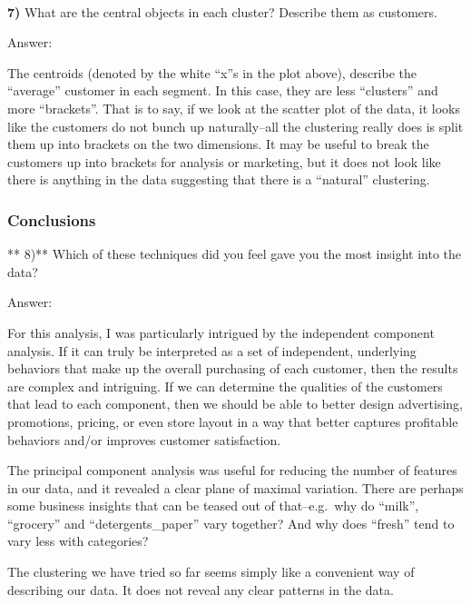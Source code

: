 \documentclass{article}
\begin{document}
    \begin{center}
    \end{center}
    { \hspace*{\fill} \\}
    
    \textbf{7)} What are the central objects in each cluster? Describe them
as customers.

    Answer:

The centroids (denoted by the white ``x''s in the plot above), describe
the ``average'' customer in each segment. In this case, they are less
``clusters'' and more ``brackets''. That is to say, if we look at the
scatter plot of the data, it looks like the customers do not bunch up
naturally--all the clustering really does is split them up into brackets
on the two dimensions. It may be useful to break the customers up into
brackets for analysis or marketing, but it does not look like there is
anything in the data suggesting that there is a ``natural'' clustering.

    \subsubsection{Conclusions}\label{conclusions}

** 8)** Which of these techniques did you feel gave you the most insight
into the data?

    Answer:

For this analysis, I was particularly intrigued by the independent
component analysis. If it can truly be interpreted as a set of
independent, underlying behaviors that make up the overall purchasing of
each customer, then the results are complex and intriguing. If we can
determine the qualities of the customers that lead to each component,
then we should be able to better design advertising, promotions,
pricing, or even store layout in a way that better captures profitable
behaviors and/or improves customer satisfaction.

The principal component analysis was useful for reducing the number of
features in our data, and it revealed a clear plane of maximal
variation. There are perhaps some business insights that can be teased
out of that--e.g.~why do ``milk'', ``grocery'' and ``detergents\_paper''
vary together? And why does ``fresh'' tend to vary less with categories?

The clustering we have tried so far seems simply like a convenient way
of describing our data. It does not reveal any clear patterns in the
data.
\end{document}
